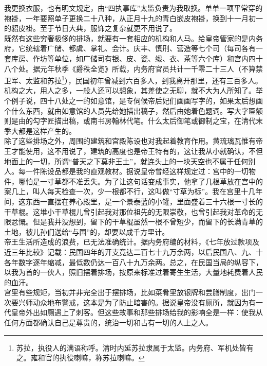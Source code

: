 我更换衣服，也有明文规定，由“四执事库”太监负责为我取换。单单一项平常穿的袍褂，一年要照单子更换二十八种，从正月十九的青白嵌皮袍褂，换到十一月初一的貂皮褂。至于节日大典，服饰之复杂就更不用说了。\\

既然有这些穷奢极侈的排场，就要有一套相应的机构和人马。给皇帝管家的是内务府，它统辖着广储、都虞、掌礼、会计。庆丰、慎刑、营造等七个司（每司各有一套库房、作坊等单位，如广储司有银、皮、瓷、缎、衣、茶等六个库）和宫内四十八个处。据元年秋季《爵秩全览》所载，内务府官员共计一千零二十三人（不算禁卫军、太监和苏拉\footnote{苏拉，执役人的满语称呼。清时内延苏拉隶属于太监。内务府、军机处皆有之。雍和官的执役喇嘛，称苏拉喇嘛。}），民国初年曾减到六百多人，到我离开那里，还有三百多人。机构之大，用人之多，一般人还可以想象，其差使之无聊，就不大为人所知了。举个例子说，四十八处之一的如意馆，是专伺候帝后妃们画画写字的，如果太后想画个什么东西，就由如意馆的人员先给她描出稿子，然后由她着色题词。写大字匾额则是由的勾字匠描出稿，或南书房翰林代笔。什么太后御笔或御制之宝，在清代末季大都是这样产生的。\\

除了这些排场之外，周围的建筑和宫殿陈设也对我起着教育作用。黄琉璃瓦惟有帝王才能使用，这不用说了，建筑的高度也是帝王特有的，这让我从小就确认，不但地面上的一切，所谓“普天之下莫非王土”，就连头上的一块天空也不属于任何别人。每一件陈设品都是我的直观教材。据说皇帝曾经这样规定过：宫中的一切物件，哪怕是一寸草都不准丢失。为了让这句话变成事实，他拿了几根草放在宫中的案几上，叫人每天检查一次，少一根都不行，这叫做“寸草为标”。我在宫里十几年间，这东西一直摆在养心殿里，是一个景泰蓝的小罐，里面盛着三十六根一寸长的干草棍。这堆小干草棍儿曾引起我对那位祖先的无限崇敬，也曾引起我对革命的无限忿慨。但是我并没想到，留下的干草棍虽然一根不曾短少，而留下的长满青草的土地，被儿孙们送给“与国”的，却要以成千方里计。\\

帝王生活所造成的浪费，已无法准确统计。据内务府编的材料，《七年放过款项及近三年比较》记载：民国四年的开支竟达二百七十九万余两，以后民国八、九、十各年数字逐年缩减，最低数仍达一百八十九万余两。总之，在民国当局的纵容下，以我为首的一伙人，照旧摆着排场，按原来标准过着寄生生活，大量地耗费着人民的血汗。\\

宫里有些规矩，当初并非完全出于摆排场，比如菜肴里放银牌和尝膳制度，出门一次要兴师动众地布警戒，这本是为了防止暗害的。据说皇帝没有厕所，就因为有一代皇帝外出如厕遇上了刺客。但这些故事和那些排场给我的影响全是一样：使我从任何方面都确认自己是尊贵的，统治一切和占有一切的人上之人。
